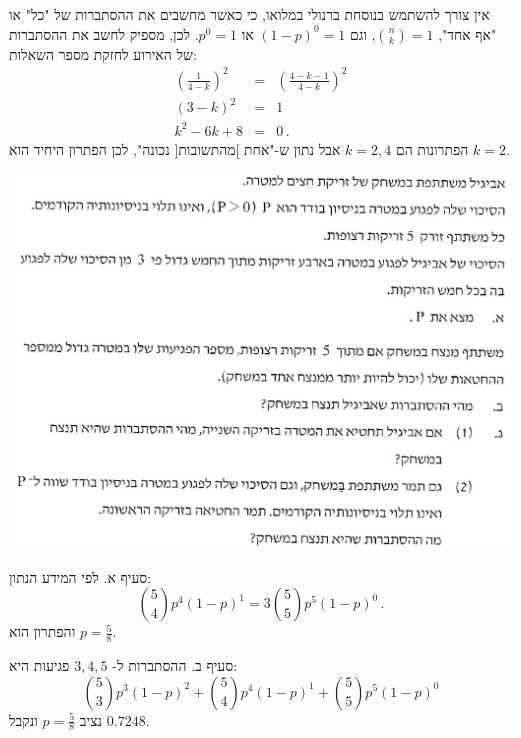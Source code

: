 \documentclass[12pt,a4paper]{article}
\begin{document}
אין צורך להשתמש בנוסחת ברנולי במלואו, כי כאשר מחשבים את ההסתברות של "כל" או "אף אחד", 
${n\choose k}=1$,
וגם
$(1-p)^0=1$
או
$p^0=1$.
לכן, מספיק לחשב את ההסתברות של האירוע לחזקת מספר השאלות:
\begin{eqnarray*}
\left(\frac{1}{4-k}\right)^2 &=&\left(\frac{4-k-1}{4-k}\right)^2\\
(3-k)^2&=&1\\
k^2-6k+8&=& 0\,.
\end{eqnarray*}
הפתרונות הם 
$k=2,4$
אבל נתון ש-"אחת ]מהתשובות[ נכונה", לכן הפתרון היחיד הוא
$k=2$.


\newpage

\textbf{}

\begin{center}
\includegraphics[width=.95\textwidth]{winter-2017-3.png}
\end{center}
\vspace{-1ex}

סעיף א. לפי המידע הנתון:
\[
{5 \choose 4} p^4(1-p)^1 = 3{5\choose 5}p^5(1-p)^0\,.
\]
והפתרון הוא
$p=\frac{5}{8}$.

סעיף ב. ההסתברות ל-%
$3,4,5$
פגיעות היא:
\[
{5 \choose 3}p^3(1-p)^2 + {5 \choose 4}p^4(1-p)^1 + {5 \choose 5}p^5(1-p)^0
\]
נציב
$p=\frac{5}{8}$
ונקבל
$0.7248$.
\end{document}
